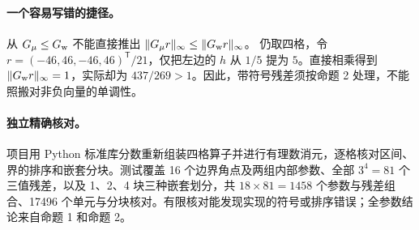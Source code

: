 \paragraph{一个容易写错的捷径。}
从 $G_\mu\le G_{\rm w}$ 不能直接推出 $\|G_\mu r\|_\infty\le\|G_{\rm w}r\|_\infty$。
仍取四格，令 $r=(-46,46,-46,46)^\mathsf{T}/21$，仅把左边的 $h$ 从 $1/5$ 提为 $5$。直接相乘得到 $\|G_{\rm w}r\|_\infty=1$，实际却为 $437/269>1$。因此，带符号残差须按命题 2 处理，不能照搬对非负向量的单调性。

\paragraph{独立精确核对。}
项目用 Python 标准库分数重新组装四格算子并进行有理数消元，逐格核对区间、界的排序和嵌套分块。测试覆盖 16 个边界角点及两组内部参数、全部 $3^4=81$ 个三值残差，以及 1、2、4 块三种嵌套划分，共 $18\times81=1458$ 个参数与残差组合、17496 个单元与分块核对。有限核对能发现实现的符号或排序错误；全参数结论来自命题 1 和命题 2。
